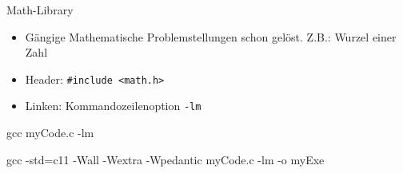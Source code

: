 
\begin{frame}[fragile]{Math-Library}
%
\begin{itemize}
\item Gängige Mathematische Problemstellungen schon gelöst. Z.\;B.: Wurzel einer Zahl
\item Header: \texttt{#include <math.h>} %
\item Linken: Kommandozeilenoption \texttt{-lm}
\end{itemize}
%
\begin{cmdbox}
gcc myCode.c {\color{cyan}-lm}
\end{cmdbox}
\begin{cmdbox}
gcc -std=c11 -Wall -Wextra -Wpedantic myCode.c {\color{cyan}-lm} -o myExe
\end{cmdbox}
%
\end{frame}


